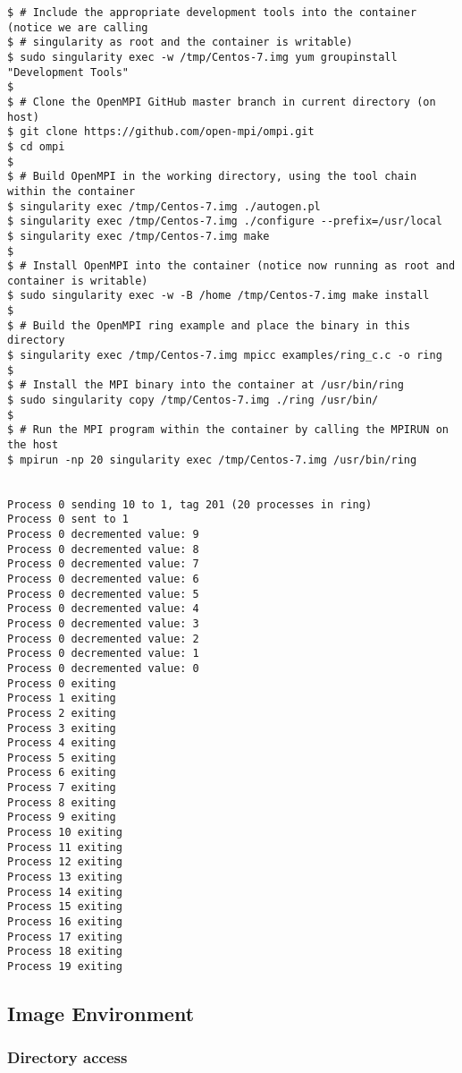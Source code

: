 \documentclass[a4paper]{article}
\begin{document}
\begin{lstlisting}[frame=single]
$ # Include the appropriate development tools into the container (notice we are calling
$ # singularity as root and the container is writable)
$ sudo singularity exec -w /tmp/Centos-7.img yum groupinstall "Development Tools"
$
$ # Clone the OpenMPI GitHub master branch in current directory (on host)
$ git clone https://github.com/open-mpi/ompi.git
$ cd ompi
$
$ # Build OpenMPI in the working directory, using the tool chain within the container
$ singularity exec /tmp/Centos-7.img ./autogen.pl
$ singularity exec /tmp/Centos-7.img ./configure --prefix=/usr/local
$ singularity exec /tmp/Centos-7.img make
$
$ # Install OpenMPI into the container (notice now running as root and container is writable)
$ sudo singularity exec -w -B /home /tmp/Centos-7.img make install
$
$ # Build the OpenMPI ring example and place the binary in this directory
$ singularity exec /tmp/Centos-7.img mpicc examples/ring_c.c -o ring
$
$ # Install the MPI binary into the container at /usr/bin/ring
$ sudo singularity copy /tmp/Centos-7.img ./ring /usr/bin/
$
$ # Run the MPI program within the container by calling the MPIRUN on the host
$ mpirun -np 20 singularity exec /tmp/Centos-7.img /usr/bin/ring


Process 0 sending 10 to 1, tag 201 (20 processes in ring)
Process 0 sent to 1
Process 0 decremented value: 9
Process 0 decremented value: 8
Process 0 decremented value: 7
Process 0 decremented value: 6
Process 0 decremented value: 5
Process 0 decremented value: 4
Process 0 decremented value: 3
Process 0 decremented value: 2
Process 0 decremented value: 1
Process 0 decremented value: 0
Process 0 exiting
Process 1 exiting
Process 2 exiting
Process 3 exiting
Process 4 exiting
Process 5 exiting
Process 6 exiting
Process 7 exiting
Process 8 exiting
Process 9 exiting
Process 10 exiting
Process 11 exiting
Process 12 exiting
Process 13 exiting
Process 14 exiting
Process 15 exiting
Process 16 exiting
Process 17 exiting
Process 18 exiting
Process 19 exiting

\end{lstlisting}

\subsection{Image Environment}
\subsubsection{Directory access}
\end{document}
